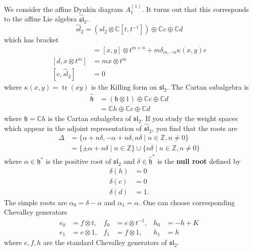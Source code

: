 \documentclass[12pt]{article}
\begin{document}
\begin{example}
    [Affine $\sl_2$] We consider the affine Dynkin diagram $A_1^{(1)}$. It turns out that this corresponds to the affine Lie algebra $\widehat{\mathfrak{sl}}_2$.
    \[\widehat{sl}_2 = (sl_2\otimes\mathbb C[t,t^{-1}]) \oplus \mathbb Cc \oplus \mathbb Cd\] which has bracket \begin{align*}
        [x\otimes t^m, y\otimes t^n] & = [x,y]\otimes t^{m+n} + m\delta_{m,-n}\kappa(x,y)c \\
        [d, x\otimes t^m]            & = m x\otimes t^m                                    \\
        [c, \widehat{sl}_2]          & = 0
    \end{align*} where $\kappa(x,y) = \operatorname{tr}(xy)$ is the Killing form on $\mathfrak{sl}_2$. The Cartan subalgebra is \begin{align*}
        \widehat{\mathfrak{h}} & = (\mathfrak{h}\otimes 1) \oplus \mathbb{C}c \oplus \mathbb{C}d \\
                               & = \mathbb{C}h \oplus \mathbb{C}c \oplus \mathbb{C}d
    \end{align*} where $\mathfrak{h} = \mathbb{C}h$ is the Cartan subalgebra of $\mathfrak{sl}_2$. If you study the weight spaces which appear in the adjoint representation of $\widehat{\mathfrak{sl}}_2$, you find that the roots are \begin{align*}
        \Delta & = \{\alpha + n\delta, -\alpha + n\delta, n\delta \mid n \in \mathbb{Z}, n \neq 0\}                \\
               & = \{\pm \alpha + n\delta \mid n \in \mathbb{Z}\} \cup \{n\delta \mid n \in \mathbb{Z}, n \neq 0\}
    \end{align*} where $\alpha \in \mathfrak{h}^*$ is the positive root of $\mathfrak{sl}_2$ and $\delta \in \widehat{\mathfrak{h}}^*$ is the \textbf{null root} defined by \begin{align*}
        \delta(h) & = 0  \\
        \delta(c) & = 0  \\
        \delta(d) & = 1.
    \end{align*} The simple roots are $\alpha_0 = \delta - \alpha$ and $\alpha_1 = \alpha$. One can choose corresponding Chevalley generators \begin{align*}
        e_0 & = f \otimes t, & f_0 & = e \otimes t^{-1}, & h_0 & = -h + K \\
        e_1 & = e \otimes 1, & f_1 & = f \otimes 1,      & h_1 & = h
    \end{align*} where $e,f,h$ are the standard Chevalley generators of $\mathfrak{sl}_2$.


\end{example}
\end{document}

